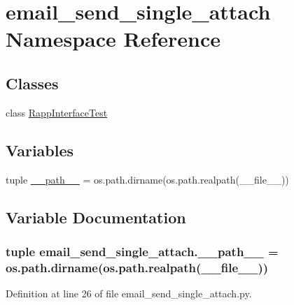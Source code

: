 \hypertarget{namespaceemail__send__single__attach}{\section{email\-\_\-send\-\_\-single\-\_\-attach Namespace Reference}
\label{namespaceemail__send__single__attach}
}
\subsection*{Classes}
\begin{DoxyCompactItemize}
\item 
class \hyperlink{classemail__send__single__attach_1_1RappInterfaceTest}{Rapp\-Interface\-Test}
\end{DoxyCompactItemize}
\subsection*{Variables}
\begin{DoxyCompactItemize}
\item 
tuple \hyperlink{namespaceemail__send__single__attach_a6ca1b79bd2144cd0f8a4fac5a433d999}{\-\_\-\-\_\-path\-\_\-\-\_\-} = os.\-path.\-dirname(os.\-path.\-realpath(\-\_\-\-\_\-file\-\_\-\-\_\-))
\end{DoxyCompactItemize}


\subsection{Variable Documentation}
\hypertarget{namespaceemail__send__single__attach_a6ca1b79bd2144cd0f8a4fac5a433d999}{
\subsubsection[{\-\_\-\-\_\-path\-\_\-\-\_\-}]{\setlength{\rightskip}{0pt plus 5cm}tuple email\-\_\-send\-\_\-single\-\_\-attach.\-\_\-\-\_\-path\-\_\-\-\_\- = os.\-path.\-dirname(os.\-path.\-realpath(\-\_\-\-\_\-file\-\_\-\-\_\-))}}\label{namespaceemail__send__single__attach_a6ca1b79bd2144cd0f8a4fac5a433d999}


Definition at line 26 of file email\-\_\-send\-\_\-single\-\_\-attach.\-py.

